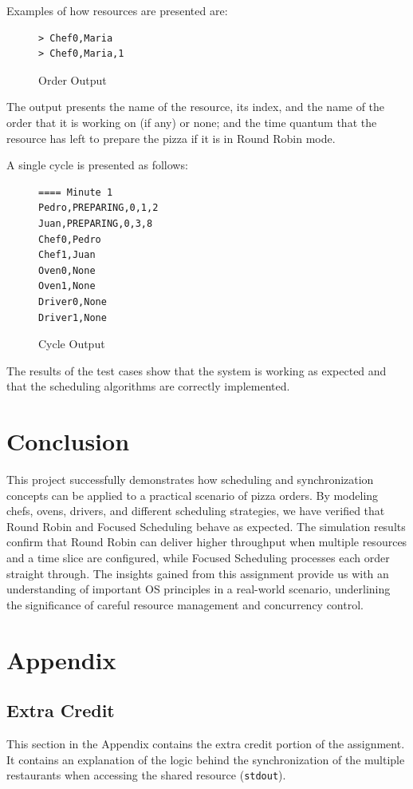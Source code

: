 \documentclass[conference]{IEEEtran}
\begin{document}
Examples of how resources are presented are:
\begin{figure}[H]
    \centering
    \begin{lstlisting}[style=input, frame=single]
> Chef0,Maria
> Chef0,Maria,1
    \end{lstlisting}
    \caption{\centering Order Output}
    \label{fig:res_output}
\end{figure}
 
The output presents the name of the resource, its index, and the name of the order that it is working on (if any) or none; and the time quantum that the resource has left to prepare the pizza if it is in Round Robin mode.

A single cycle is presented as follows:
\begin{figure}[H]
    \centering
    \begin{lstlisting}[style=input, frame=single]
==== Minute 1
Pedro,PREPARING,0,1,2
Juan,PREPARING,0,3,8
Chef0,Pedro
Chef1,Juan
Oven0,None
Oven1,None
Driver0,None
Driver1,None
    \end{lstlisting}
    \caption{\centering Cycle Output}
    \label{fig:cycle_output}
\end{figure}

The results of the test cases show that the system is working as expected and that the scheduling algorithms are correctly implemented.

\section{Conclusion}
This project successfully demonstrates how scheduling and synchronization concepts can be applied to a practical scenario of pizza orders. By modeling chefs, ovens, drivers, and different scheduling strategies, we have verified that Round Robin and Focused Scheduling behave as expected. The simulation results confirm that Round Robin can deliver higher throughput when multiple resources and a time slice are configured, while Focused Scheduling processes each order straight through. The insights gained from this assignment provide us with an understanding of important OS principles in a real-world scenario, underlining the significance of careful resource management and concurrency control.

\appendix
\section{Appendix}
\subsection{Extra Credit}
This section in the Appendix contains the extra credit portion of the assignment. It contains an explanation of the logic behind the synchronization of the multiple restaurants when accessing the shared resource (\texttt{stdout}).
\end{document}
